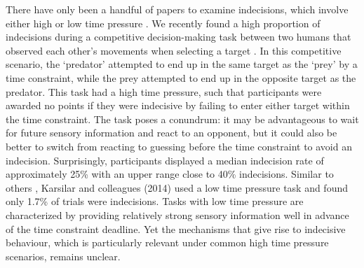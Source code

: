 \documentclass[man,donotrepeattitle,floatsintext,letterpaper,12pt]{apa7}
\begin{document}
There have only been a handful of papers to examine indecisions, which involve either high \autocite{lokeshHumansUtilizeSensory2022} or low time pressure \autocite{karsilarSpeedAccuracyTradeoff2014, wuCapacityCognitiveControl2016,philiastidesCausalRoleDorsolateral2011, dambacherTimePressureAffects2015,forstmannStriatumPreSMAFacilitate2008}. We recently found a high proportion of indecisions during a competitive decision-making task between two humans that observed each other’s movements when selecting a target \autocite{lokeshHumansUtilizeSensory2022}. In this competitive scenario, the ‘predator’ attempted to end up in the same target as the ‘prey’ by a time constraint, while the prey attempted to end up in the opposite target as the predator. This task had a high time pressure, such that participants were awarded no points if they were indecisive by failing to enter either target within the time constraint. The task poses a conundrum: it may be advantageous to wait for future sensory information and react to an opponent, but it could also be better to switch from reacting to guessing before the time constraint to avoid an indecision. Surprisingly, participants displayed a median indecision rate of approximately 25\% with an upper range close to 40\% indecisions. Similar to others \autocite{karsilarSpeedAccuracyTradeoff2014, wuCapacityCognitiveControl2016, philiastidesCausalRoleDorsolateral2011, dambacherTimePressureAffects2015, forstmannStriatumPreSMAFacilitate2008}, Karsilar and colleagues (2014) used a low time pressure task and found only 1.7\% of trials were indecisions. Tasks with low time pressure are characterized by providing relatively strong sensory information well in advance of the time constraint deadline. Yet the mechanisms that give rise to indecisive behaviour, which is particularly relevant under common high time pressure scenarios, remains unclear. 
\end{document}
